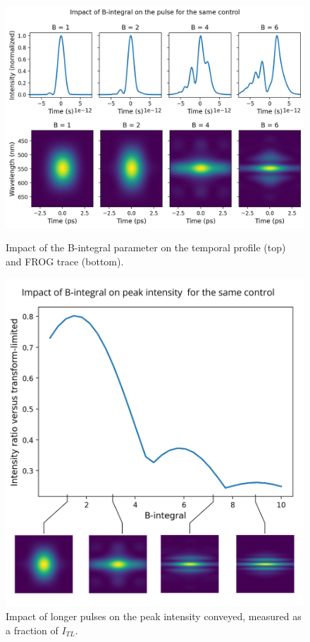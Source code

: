 \begin{figure}
    \centering
    \begin{minipage}{0.58\linewidth}
        \centering
        \includegraphics[width=\linewidth]{images/B_integral.png}
        \caption{Impact of the B-integral parameter on the temporal profile (top) and FROG trace (bottom).}
        \label{fig:b_integral}
    \end{minipage}
    \hfill
    \begin{minipage}{0.4\linewidth}
        \centering
        \includegraphics[width=\linewidth]{images/peak_intensity.png}
        \caption{Impact of longer pulses on the peak intensity conveyed, measured as a fraction of $I_{TL}$.}
        \label{fig:dynamics_peak_intensity}
    \end{minipage}
\end{figure}


